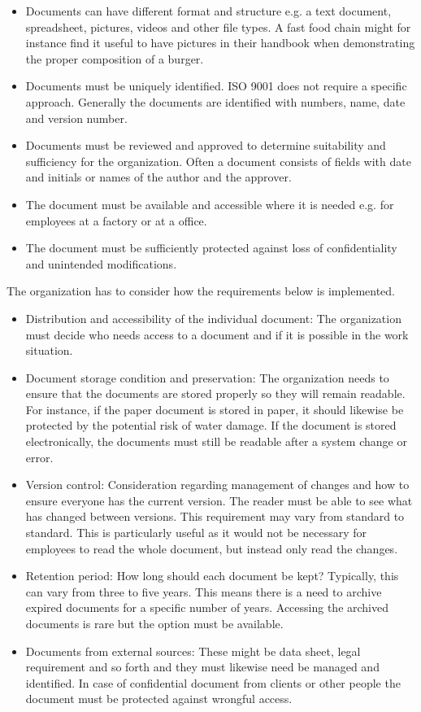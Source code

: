 \begin{itemize}
	\item Documents can have different format and structure e.g. a text document, spreadsheet, pictures, videos and other file types. A fast food chain might for instance find it useful to have pictures in their handbook when demonstrating the proper composition of a burger.
	\item Documents must be uniquely identified. ISO 9001 does not require a specific approach. Generally the documents are identified with numbers, name, date and version number.
	\item Documents must be reviewed and approved to determine suitability and sufficiency for the organization. Often a document consists of fields with date and initials or names of the author and  the approver.
	\item The document must be available and accessible where it is needed e.g. for employees at a factory or at a office.
	\item The document must be sufficiently protected against loss of confidentiality and unintended modifications.
\end{itemize}

The organization has to consider how the requirements below is implemented.

\begin{itemize}
	\item Distribution and accessibility of the individual document: The organization must decide who needs access to a document and if it is possible in the work situation.
	\item Document storage condition and preservation: The organization needs to ensure that the documents are stored properly so they will remain readable. For instance, if the paper document is stored in paper, it should likewise be protected by the potential risk of water damage. If the document is stored electronically, the documents must still be readable after a system change or error.
	\item Version control: Consideration regarding management of changes and how to ensure everyone has the current version. The reader must be able to see what has changed between versions. This requirement may vary from standard to standard. This is particularly useful as it would not be necessary for employees to read the whole document, but instead only read the changes.
	\item Retention period: How long should each document be kept? Typically, this can vary from three to five years. This means there is a need to archive expired documents for a specific number of years. Accessing the archived documents is rare but the option must be available.
	\item Documents from external sources: These might be data sheet, legal requirement and so forth and they must likewise need be managed and identified. In case of confidential document from clients or other people the document must be protected against wrongful access.
\end{itemize}

